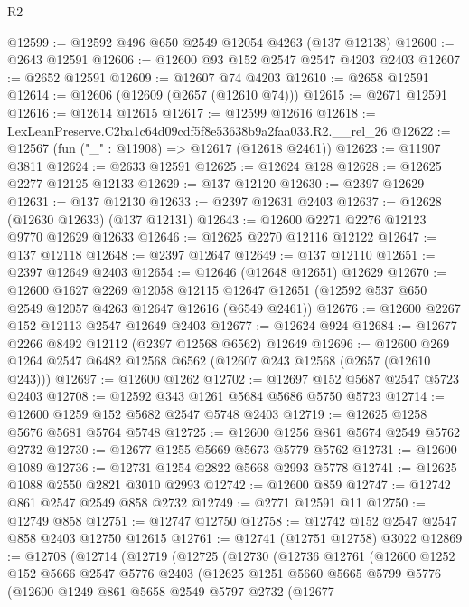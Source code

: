 \begin{lexlean}{R2}
\begin{coremodule}
@12599 := @12592 @496 @650 @2549 @12054 @4263 (@137 @12138)
@12600 := @2643 @12591
@12606 := @12600 @93 @152 @2547 @2547 @4203 @2403
@12607 := @2652 @12591
@12609 := @12607 @74 @4203
@12610 := @2658 @12591
@12614 := @12606 (@12609 (@2657 (@12610 @74)))
@12615 := @2671 @12591
@12616 := @12614 @12615
@12617 := @12599 @12616
@12618 := LexLeanPreserve.C2ba1c64d09cdf5f8e53638b9a2faa033.R2.__rel_26
@12622 := @12567 (fun ("_" : @11908) => @12617 (@12618 @2461))
@12623 := @11907 @3811
@12624 := @2633 @12591
@12625 := @12624 @128
@12628 := @12625 @2277 @12125 @12133
@12629 := @137 @12120
@12630 := @2397 @12629
@12631 := @137 @12130
@12633 := @2397 @12631 @2403
@12637 := @12628 (@12630 @12633) (@137 @12131)
@12643 := @12600 @2271 @2276 @12123 @9770 @12629 @12633
@12646 := @12625 @2270 @12116 @12122
@12647 := @137 @12118
@12648 := @2397 @12647
@12649 := @137 @12110
@12651 := @2397 @12649 @2403
@12654 := @12646 (@12648 @12651) @12629
@12670 := @12600
    @1627
    @2269
    @12058
    @12115
    @12647
    @12651
    (@12592 @537 @650 @2549 @12057 @4263 @12647 @12616 (@6549 @2461))
@12676 := @12600 @2267 @152 @12113 @2547 @12649 @2403
@12677 := @12624 @924
@12684 := @12677 @2266 @8492 @12112 (@2397 @12568 @6562) @12649
@12696 := @12600 @269 @1264 @2547 @6482 @12568 @6562 (@12607 @243 @12568 (@2657 (@12610 @243)))
@12697 := @12600 @1262
@12702 := @12697 @152 @5687 @2547 @5723 @2403
@12708 := @12592 @343 @1261 @5684 @5686 @5750 @5723
@12714 := @12600 @1259 @152 @5682 @2547 @5748 @2403
@12719 := @12625 @1258 @5676 @5681 @5764 @5748
@12725 := @12600 @1256 @861 @5674 @2549 @5762 @2732
@12730 := @12677 @1255 @5669 @5673 @5779 @5762
@12731 := @12600 @1089
@12736 := @12731 @1254 @2822 @5668 @2993 @5778
@12741 := @12625 @1088 @2550 @2821 @3010 @2993
@12742 := @12600 @859
@12747 := @12742 @861 @2547 @2549 @858 @2732
@12749 := @2771 @12591 @11
@12750 := @12749 @858
@12751 := @12747 @12750
@12758 := @12742 @152 @2547 @2547 @858 @2403 @12750 @12615
@12761 := @12741 (@12751 @12758) @3022
@12869 := @12708
    (@12714
      (@12719
        (@12725
          (@12730
            (@12736
              @12761
              (@12600
                @1252
                @152
                @5666
                @2547
                @5776
                @2403
                (@12625
                  @1251
                  @5660
                  @5665
                  @5799
                  @5776
                  (@12600
                    @1249
                    @861
                    @5658
                    @2549
                    @5797
                    @2732
                    (@12677

\end{coremodule}
\end{lexlean}
